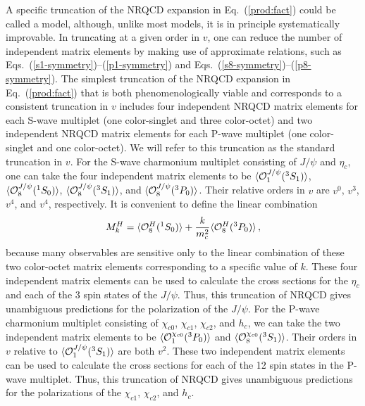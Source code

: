 A specific truncation of the NRQCD expansion in Eq.~(\ref{prod:fact})
could be called a model, although, unlike most models, 
it is in principle systematically improvable. 
In truncating at a given order in $v$, one
can reduce the number of independent matrix elements by making use of
approximate relations, such as 
Eqs.~(\ref{s1-symmetry})--(\ref{p1-symmetry}) and
Eqs.~(\ref{s8-symmetry})--(\ref{p8-symmetry}).
The simplest truncation of the NRQCD
expansion in Eq.~(\ref{prod:fact}) that is both phenomenologically
viable and corresponds to a consistent truncation in $v$ includes four
independent NRQCD matrix elements for each S-wave multiplet 
(one color-singlet and three color-octet) 
and two independent NRQCD matrix elements for each P-wave multiplet 
(one color-singlet and one color-octet).  
We will refer to this truncation as the standard truncation in $v$.
For the S-wave charmonium multiplet
consisting of $J/\psi$ and $\eta_c$, one can take the 
four independent matrix elements to be
$\langle {\cal O}^{J/\psi}_1({}^3S_1) \rangle$,
$\langle {\cal O}^{J/\psi}_8({}^1S_0) \rangle$,
$\langle {\cal O}^{J/\psi}_8({}^3S_1) \rangle$, and
$\langle {\cal O}^{J/\psi}_8({}^3P_0) \rangle$.  
Their relative orders in $v$ are $v^0$, $v^3$, $v^4$, and $v^4$,
respectively. It is convenient to define the linear combination
%
\begin{equation}
M_k^H = 
\langle {\cal O}^H_8({}^1S_0) \rangle +
 {k \over m_c^2} \langle {\cal O}^H_8({}^3P_0) \rangle \, ,
\label{prod:lincomb}
\end{equation}
%
because many observables are sensitive only to the linear combination
of these two color-octet matrix elements corresponding to a specific
value of $k$.  
These four independent matrix elements can be used to calculate 
the cross sections for the $\eta_c$ and each of the 3 spin states 
of the $J/\psi$. Thus, this truncation of NRQCD gives
unambiguous predictions for the polarization of the $J/\psi$. 
For the P-wave charmonium multiplet consisting of
$\chi_{c0}$, $\chi_{c1}$, $\chi_{c2}$, and $h_c$, we can take the
two independent matrix elements to be 
$\langle {\cal O}^{\chi_{c0}}_1({}^3P_0) \rangle$ and 
$\langle {\cal O}^{\chi_{c0}}_8({}^3S_1) \rangle$. 
Their orders in $v$ relative to
$\langle {\cal O}^{J/\psi}_1({}^3S_1) \rangle$ are both $v^2$.  
These two independent matrix elements can be used to calculate 
the cross sections for each of the 12 spin states in the 
P-wave multiplet.  Thus, this truncation of NRQCD gives
unambiguous predictions for the polarizations of 
the $\chi_{c1}$, $\chi_{c2}$, and $h_c$.

